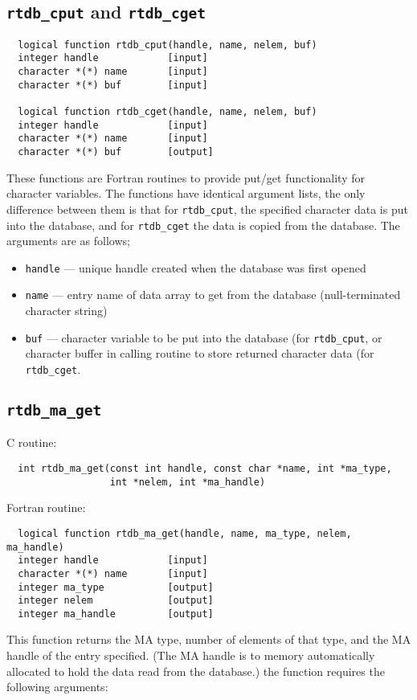 \subsection{{\tt rtdb\_cput} and {\tt rtdb\_cget}}

\begin{verbatim}
  logical function rtdb_cput(handle, name, nelem, buf)
  integer handle            [input]
  character *(*) name       [input]
  character *(*) buf        [input]

  logical function rtdb_cget(handle, name, nelem, buf)
  integer handle            [input]
  character *(*) name       [input]
  character *(*) buf        [output]
\end{verbatim}
These functions are Fortran routines to provide put/get functionality for character
variables.  The functions have identical argument lists, the only difference between them is that for
{\tt rtdb\_cput}, the specified character data is put into the database, and for 
{\tt rtdb\_cget} the data is copied from the database.  The arguments are as follows;

\begin{itemize}
\item {\tt handle} --- unique handle created when the database was first opened
\item {\tt name} --- entry name of data array to get from the database (null-terminated character string)
\item {\tt buf} --- character variable to be put into the database (for {\tt rtdb\_cput}, or character
buffer in calling routine to store returned character data (for {\tt rtdb\_cget}.
\end{itemize}

\subsection{{\tt rtdb\_ma\_get}}

C routine:

\begin{verbatim}
  int rtdb_ma_get(const int handle, const char *name, int *ma_type,
                  int *nelem, int *ma_handle)
\end{verbatim}


Fortran routine:

\begin{verbatim}
  logical function rtdb_ma_get(handle, name, ma_type, nelem, ma_handle)
  integer handle            [input]
  character *(*) name       [input]
  integer ma_type           [output]
  integer nelem             [output]
  integer ma_handle         [output]
\end{verbatim}
This function returns the MA type, number of elements of that type, and the MA handle
of the entry specified.  (The MA handle is to memory
automatically allocated to hold the data read from the database.)  the function requires
the following arguments:

